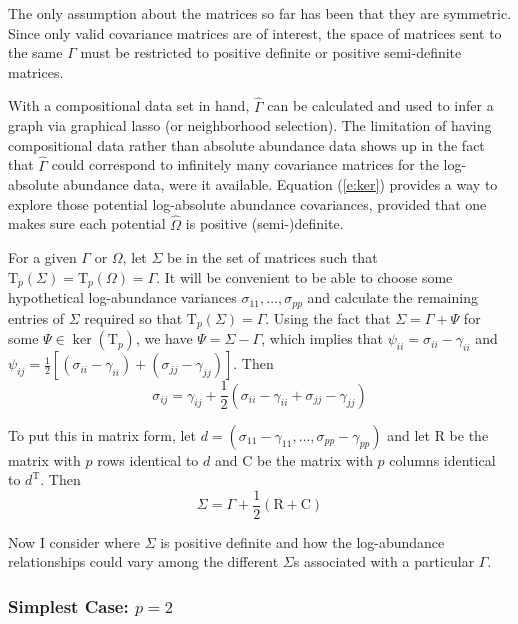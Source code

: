 \documentclass[10pt]{article}
\begin{document}
The only assumption about the matrices so far has been that they are symmetric. Since only valid covariance matrices are of interest, the space of matrices sent to the same $\Gamma$ must be restricted to positive definite or positive semi-definite matrices.

With a compositional data set in hand, $\hat{\Gamma}$ can be calculated and used to infer a graph via graphical lasso (or neighborhood selection). The limitation of having compositional data rather than absolute abundance data shows up in the fact that $\hat{\Gamma}$ could correspond to infinitely many covariance matrices for the log-absolute abundance data, were it available. Equation (\ref{e:ker}) provides a way to explore those potential log-absolute abundance covariances, provided that one makes sure each potential $\hat{\Omega}$ is positive (semi-)definite.

For a given $\Gamma$ or $\Omega$, let $\Sigma$ be in the set of matrices such that $\mathrm{T}_p(\Sigma) = \mathrm{T}_p(\Omega) = \Gamma$. It will be convenient to be able to choose some hypothetical log-abundance variances $\sigma_{11}, \dots, \sigma_{pp}$ and calculate the remaining entries of $\Sigma$ required so that $\mathrm{T}_p(\Sigma) = \Gamma$. Using the fact that $\Sigma = \Gamma + \Psi$ for some $\Psi \in \ker(\mathrm{T}_p)$, we have $\Psi = \Sigma - \Gamma$, which implies that $\psi_{ii} = \sigma_{ii} - \gamma_{ii}$ and $\psi_{ij} = \frac{1}{2}\left[(\sigma_{ii} - \gamma_{ii}) + (\sigma_{jj} - \gamma_{jj})\right]$. Then
\begin{equation}
\label{e:sigentry}
\sigma_{ij} = \gamma_{ij} + \frac{1}{2}(\sigma_{ii} - \gamma_{ii} + \sigma_{jj} - \gamma_{jj})
\end{equation}

To put this in matrix form, let $d = (\sigma_{11} - \gamma_{11}, \dots, \sigma_{pp} - \gamma_{pp})$ and let $\mathrm{R}$ be the matrix with $p$ rows identical to $d$ and $\mathrm{C}$ be the matrix with $p$ columns identical to $d^\mathrm{T}$. Then
\begin{equation}
\label{e:sigmatrix}
\Sigma = \Gamma + \frac{1}{2}(\mathrm{R} + \mathrm{C})
\end{equation}

Now I consider where $\Sigma$ is positive definite and how the log-abundance relationships could vary among the different $\Sigma$s associated with a particular $\Gamma$.

\subsubsection*{Simplest Case: $p=2$}
\end{document}

